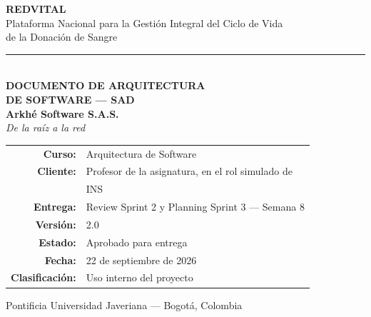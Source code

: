 \documentclass[11pt,a4paper]{article}
\begin{document}
\begin{titlepage}
\centering
\vspace*{2.0cm}


{\Huge\bfseries\color{vinotinto} REDVITAL}\\[0.5cm]
{\large\color{vinotinto} Plataforma Nacional para la Gestión Integral del Ciclo de Vida\\ de la Donación de Sangre}\\[1.6cm]

{\color{vinotinto}\rule{0.45\textwidth}{1.2pt}}\\[1.6cm]

{\LARGE\bfseries DOCUMENTO DE ARQUITECTURA}\\[0.4cm]
{\LARGE\bfseries DE SOFTWARE --- SAD}\\[1.8cm]

{\large\bfseries Arkhé Software S.A.S.}\\[0.3cm]
{\itshape De la raíz a la red}\\[1.8cm]

\begin{tabular}{r l}
\textbf{Curso:} & Arquitectura de Software  \\
\textbf{Cliente:} & Profesor de la asignatura, en el rol simulado de \\
 & INS \\
\textbf{Entrega:} & Review Sprint 2 y Planning Sprint 3 --- Semana 8 \\
\textbf{Versión:} & 2.0 \\
\textbf{Estado:} & Aprobado para entrega \\
\textbf{Fecha:} & 22 de septiembre de 2026 \\
\textbf{Clasificación:} & Uso interno del proyecto \\
\end{tabular}

\vfill
{\small\color{grisTexto} Pontificia Universidad Javeriana --- Bogotá, Colombia}
\end{titlepage}

\end{document}
